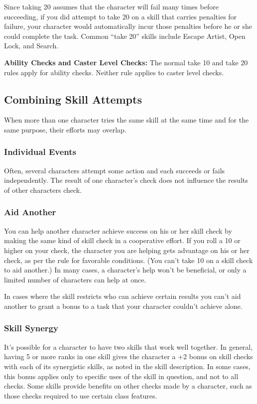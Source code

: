 Since taking 20 assumes that the character will fail many times before succeeding, if you did attempt to take 20 on a skill that carries penalties for failure, your character would automatically incur those penalties before he or she could complete the task. Common ``take 20'' skills include Escape Artist, Open Lock, and Search.

\textbf{Ability Checks and Caster Level Checks:} The normal take 10 and take 20 rules apply for ability checks. Neither rule applies to caster level checks.

\subsection{Combining Skill Attempts}
When more than one character tries the same skill at the same time and for the same purpose, their efforts may overlap.

\subsubsection{Individual Events}
Often, several characters attempt some action and each succeeds or fails independently. The result of one character's  check does not influence the results of other characters  check.

\subsubsection{Aid Another}
You can help another character achieve success on his or her skill check by making the same kind of skill check in a cooperative effort. If you roll a 10 or higher on your check, the character you are helping gets advantage on his or her check, as per the rule for favorable conditions. (You can't take 10 on a skill check to aid another.) In many cases, a character's help won't be beneficial, or only a limited number of characters can help at once.

In cases where the skill restricts who can achieve certain results you can't aid another to grant a bonus to a task that your character couldn't achieve alone.

\subsubsection{Skill Synergy}
It's possible for a character to have two skills that work well together. In general, having 5 or more ranks in one skill gives the character a +2 bonus on skill checks with each of its synergistic skills, as noted in the skill description. In some cases, this bonus applies only to specific uses of the skill in question, and not to all checks. Some skills provide benefits on other checks made by a character, such as those checks required to use certain class features.

